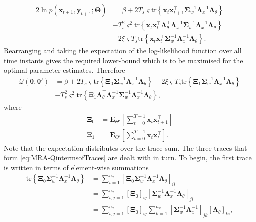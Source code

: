 \documentclass[11pt,draftcls,onecolumn,peerreview]{IEEEtran}
\begin{document}
\begin{align}\label{eq:Qfunctionintrace}
2\ln p(\mathbf x_{t+1}, \mathbf y_{t+1};\boldsymbol\Theta)&=\beta+2 T_s\varsigma\mathrm{tr} \left\lbrace \mathbf x_t\mathbf x_{t+1}^\top\boldsymbol\Sigma_w^{-1}\boldsymbol\Lambda_x^{-1}\boldsymbol\Lambda_{\theta}\right\rbrace \nonumber \\
&-T_s^2\varsigma^2\mathrm{tr} \left\lbrace \mathbf x_t\mathbf x_t^\top \boldsymbol\Lambda_{\theta}^\top\boldsymbol\Lambda_x^{-1}\boldsymbol\Sigma_w^{-1}\boldsymbol\Lambda_x^{-1}\boldsymbol\Lambda_{\theta}\right\rbrace\nonumber \\
&-2\xi\varsigma T_s\mathrm{tr} \left\lbrace \mathbf x_t\mathbf x_{t}^\top\boldsymbol\Sigma_w^{-1}\boldsymbol\Lambda_x^{-1}\boldsymbol\Lambda_{\theta}\right\rbrace.
\end{align}
Rearranging and taking the expectation of the log-likelihood function over all time instants gives the required lower-bound which is to be maximised for the optimal parameter estimates. Therefore 
\begin{align}\label{eq:MRA-QintermsofTraces}
\mathcal Q(\boldsymbol \theta, \boldsymbol\theta')&=\beta+2 T_s\varsigma\mathrm{tr} \left\lbrace \boldsymbol \Xi_0\boldsymbol\Sigma_w^{-1}\boldsymbol\Lambda_x^{-1}\boldsymbol\Lambda_{\theta}\right\rbrace-2\xi\varsigma T_s\mathrm{tr} \left\lbrace \boldsymbol\Xi_1\boldsymbol\Sigma_w^{-1}\boldsymbol\Lambda_x^{-1}\boldsymbol\Lambda_{\theta}\right\rbrace \nonumber \\
&-T_s^2\varsigma^2\mathrm{tr} \left\lbrace \boldsymbol\Xi_1 \boldsymbol\Lambda_{\theta}^\top\boldsymbol\Lambda_x^{-1}\boldsymbol\Sigma_w^{-1}\boldsymbol\Lambda_x^{-1}\boldsymbol\Lambda_{\theta}\right\rbrace,
\end{align}
where
\begin{align}
\boldsymbol\Xi_0&=\mathbf E_{\Theta'}\left[\sum_{t=0}^{T-1}\mathbf x_t\mathbf x_{t+1}^\top\right] \label{eq:MRA-Xi0}\\
\boldsymbol\Xi_1&=\mathbf E_{\Theta'}\left[\sum_{t=0}^{T-1}\mathbf x_t\mathbf x_{t}^\top\right] \label{eq:MRA-Xi1}.
\end{align}
Note that the expectation distributes over the trace sum. The three traces that form \eqref{eq:MRA-QintermsofTraces} are dealt with in turn. To begin, the first trace is written in terms of element-wise summations
\begin{align}\label{eq:MRA-trace1}
\mathrm{tr} \left\lbrace \boldsymbol \Xi_0\boldsymbol\Sigma_w^{-1}\boldsymbol\Lambda_x^{-1}\boldsymbol\Lambda_{\theta}\right\rbrace&=\sum_{i=1}^{n_x}\left[ \boldsymbol \Xi_0\boldsymbol\Sigma_w^{-1}\boldsymbol\Lambda_x^{-1}\boldsymbol\Lambda_{\theta}\right]_{ii} \nonumber \\
&=\sum_{i,j=1}^{n_x}\left[ \boldsymbol\Xi_0\right]_{ij}\left[\boldsymbol\Sigma_w^{-1}\boldsymbol\Lambda_x^{-1}  \boldsymbol\Lambda_{\theta}\right]_{ji}\nonumber\\
&=\sum_{i,j=1}^{n_x}\left[ \boldsymbol\Xi_0\right]_{ij}\sum_{k=1}^{n_x}\left[\boldsymbol\Sigma_w^{-1}\boldsymbol\Lambda_x^{-1} \right]_{jk} \left[ \boldsymbol\Lambda_{\theta}\right]_{ki},
\end{align}
\end{document}
